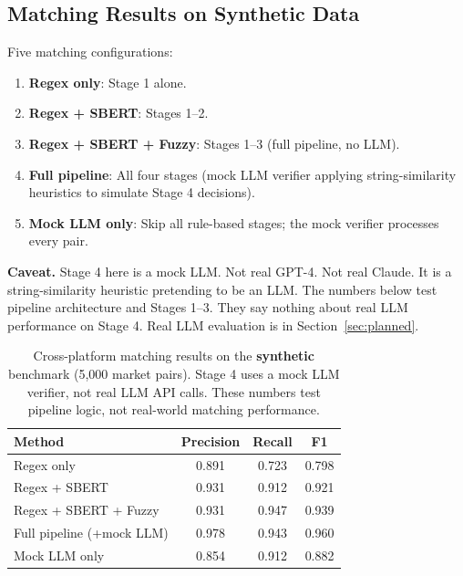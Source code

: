 \documentclass[11pt]{article}
\theoremstyle{definition}
\theoremstyle{remark}
\begin{document}
\subsection{Matching Results on Synthetic Data}
\label{sec:synth-matching}

Five matching configurations:
\begin{enumerate}
  \item \textbf{Regex only}: Stage 1 alone.
  \item \textbf{Regex + SBERT}: Stages 1--2.
  \item \textbf{Regex + SBERT + Fuzzy}: Stages 1--3 (full pipeline, no LLM).
  \item \textbf{Full pipeline}: All four stages (mock LLM verifier applying string-similarity heuristics to simulate Stage 4 decisions).
  \item \textbf{Mock LLM only}: Skip all rule-based stages; the mock verifier processes every pair.
\end{enumerate}

\textbf{Caveat.} Stage 4 here is a mock LLM. Not real GPT-4. Not real Claude. It is a string-similarity heuristic pretending to be an LLM. The numbers below test pipeline architecture and Stages 1--3. They say nothing about real LLM performance on Stage 4. Real LLM evaluation is in Section~\ref{sec:planned}.

\begin{table}[t]
\centering
\caption{Cross-platform matching results on the \textbf{synthetic} benchmark (5,000 market pairs). Stage 4 uses a mock LLM verifier, not real LLM API calls. These numbers test pipeline logic, not real-world matching performance.}
\label{tab:matching}
\begin{tabular}{lccc}
\toprule
\textbf{Method} & \textbf{Precision} & \textbf{Recall} & \textbf{F1} \\
\midrule
Regex only                          & 0.891 & 0.723 & 0.798 \\
Regex + SBERT                       & 0.931 & 0.912 & 0.921 \\
Regex + SBERT + Fuzzy               & 0.931 & 0.947 & 0.939 \\
Full pipeline (+mock LLM)           & 0.978 & 0.943 & 0.960 \\
Mock LLM only                       & 0.854 & 0.912 & 0.882 \\
\bottomrule
\end{tabular}
\end{table}
\end{document}
